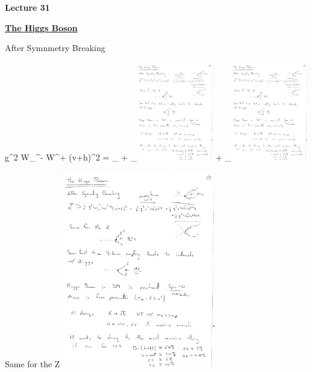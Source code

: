 



\thispagestyle{fancy}

\begin{center}
{\huge \textbf{Lecture 31}}
\end{center}

{\fontsize{14}{16}\selectfont


\textbf{\underline{The Higgs Boson}}

After Symnmetry Breaking 

\be
{} \subset {} g^2 W_\mu^- W^{+\mu} (v+h)^2 = _{}  + _{\includegraphics[width=0.25\textwidth]{./hWW.pdf}}  + _{\includegraphics[width=0.25\textwidth]{./hhWW.pdf}}
\ee

Same for the Z
\bc
\includegraphics[width=0.5\textwidth]{./hZZ.pdf}
\ec

}
